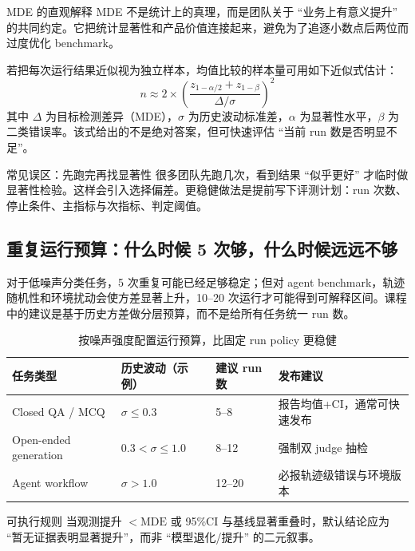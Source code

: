 \documentclass[a4paper]{article}
\begin{document}
\begin{knowledgebox}{MDE 的直观解释}
MDE 不是统计上的真理，而是团队关于 ``业务上有意义提升'' 的共同约定。它把统计显著性和产品价值连接起来，避免为了追逐小数点后两位而过度优化 benchmark。
\end{knowledgebox}

若把每次运行结果近似视为独立样本，均值比较的样本量可用如下近似式估计：
\[
n \approx 2 \times \left(\frac{z_{1-\alpha/2}+z_{1-\beta}}{\Delta/\sigma}\right)^2
\]
其中 $\Delta$ 为目标检测差异（MDE），$\sigma$ 为历史波动标准差，$\alpha$ 为显著性水平，$\beta$ 为二类错误率。该式给出的不是绝对答案，但可快速评估 ``当前 run 数是否明显不足''。

\begin{warningbox}{常见误区：先跑完再找显著性}
很多团队先跑几次，看到结果 ``似乎更好'' 才临时做显著性检验。这样会引入选择偏差。更稳健做法是提前写下评测计划：run 次数、停止条件、主指标与次指标、判定阈值。
\end{warningbox}

\subsection{重复运行预算：什么时候 5 次够，什么时候远远不够}
对于低噪声分类任务，5 次重复可能已经足够稳定；但对 agent benchmark，轨迹随机性和环境扰动会使方差显著上升，10--20 次运行才可能得到可解释区间。课程中的建议是基于历史方差做分层预算，而不是给所有任务统一 run 数。

\begin{table}[H]
\centering
\begin{tabular}{p{3.0cm}p{2.8cm}p{3.4cm}p{2.9cm}}
\toprule
\textbf{任务类型} & \textbf{历史波动（示例）} & \textbf{建议 run 数} & \textbf{发布建议} \\
\midrule
Closed QA / MCQ & $\sigma \le 0.3$ & 5--8 & 报告均值+CI，通常可快速发布 \\
Open-ended generation & $0.3 < \sigma \le 1.0$ & 8--12 & 强制双 judge 抽检 \\
Agent workflow & $\sigma > 1.0$ & 12--20 & 必报轨迹级错误与环境版本 \\
\bottomrule
\end{tabular}
\caption{按噪声强度配置运行预算，比固定 run policy 更稳健}
\end{table}

\begin{importantbox}{可执行规则}
当观测提升 $< \mathrm{MDE}$ 或 95\%CI 与基线显著重叠时，默认结论应为 ``暂无证据表明显著提升''，而非 ``模型退化/提升'' 的二元叙事。
\end{importantbox}
\end{document}
